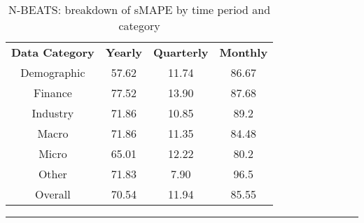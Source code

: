 \documentclass{article}
\begin{document}
\begin{table}[!ht]
	\centering
	\begin{tabular}{cccc}
	 \toprule
		\textbf{Data Category} & \textbf{Yearly} & \textbf{Quarterly} & \textbf{Monthly} \\
		Demographic &  57.62 & 11.74 & 86.67 \\
		\midrule
		Finance & 77.52 & 13.90 & 87.68 \\
		\midrule
		Industry & 71.86 & 10.85 & 89.2 \\
		\midrule
		Macro & 71.86 & 11.35 & 84.48 \\
		\midrule
		Micro & 65.01 & 12.22 & 80.2 \\
		\midrule
		Other & 71.83 & 7.90 & 96.5 \\
		\midrule
		Overall & 70.54 & 11.94 & 85.55 \\		
		\bottomrule
	\end{tabular}
	\caption*{N-BEATS: breakdown of sMAPE by time period and category}
\end{table}


\par\noindent\rule{\textwidth}{0.4pt}
\end{document}
